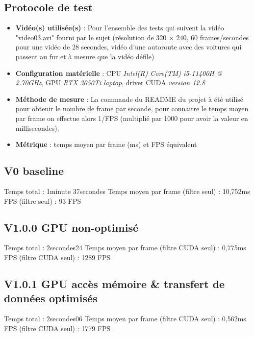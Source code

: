 \documentclass[12pt]{article}
\begin{document}
    \subsection*{Protocole de test}
    \begin{itemize}[leftmargin=1.5cm]
    \item \textbf{Vidéo(s) utilisée(s)} : Pour l'ensemble des tests qui suivent la vidéo "video03.avi" fourni par le sujet (résolution de 320 × 240, 60 frames/secondes pour une vidéo de 28 secondes, vidéo d'une autoroute avec des voitures qui passent au fur et à mesure que la vidéo défile)
    \item \textbf{Configuration matérielle} : CPU \textit{Intel(R) Core(TM) i5-11400H @ 2.70GHz}, GPU \textit{RTX 3050Ti laptop}, driver CUDA \textit{version 12.8}
    \item \textbf{Méthode de mesure} : La commande du README du projet à été utilisé pour obtenir le nombre de frame par seconde, pour connaitre le temps moyen par frame on effectue alors 1/FPS (multiplié par 1000 pour avoir la valeur en millisecondes).
    \item \textbf{Métrique} : temps moyen par frame (ms) et FPS équivalent
    \end{itemize}

    \bigskip

    \subsection{V0 baseline}
    Temps total : 1minute 37secondes \newline
    Temps moyen par frame (filtre seul) : 10,752ms \newline
    FPS (filtre seul) : 93 FPS \newline

    \subsection{V1.0.0 GPU non-optimisé}
    Temps total : 2secondes24 \newline
    Temps moyen par frame (filtre CUDA seul) : 0,775ms \newline
    FPS (filtre CUDA seul) : 1289 FPS \newline

    \subsection{V1.0.1 GPU accès mémoire \& transfert de données optimisés}
    Temps total : 2secondes06 \newline
    Temps moyen par frame (filtre CUDA seul) : 0,562ms \newline
    FPS (filtre CUDA seul) : 1779 FPS \newline
\end{document}
